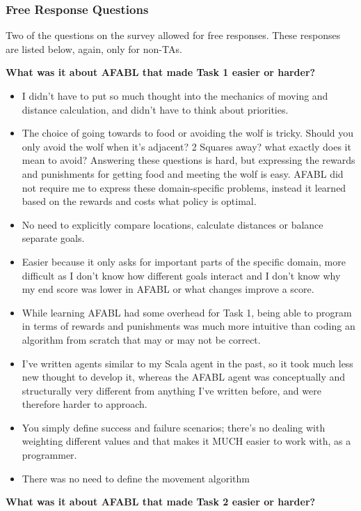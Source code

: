 \subsubsection{Free Response Questions}

Two of the questions on the survey allowed for free responses. These responses are listed below, again, only for non-TAs.

{\bf What was it about AFABL that made Task 1 easier or harder?}

\begin{itemize}
\item I didn't have to put so much thought into the mechanics of moving and distance calculation, and didn't have to think about priorities.
\item The choice of going towards to food or avoiding the wolf is tricky. Should you only avoid the wolf when it's adjacent? 2 Squares away? what exactly does it mean to avoid? Answering these questions is hard, but expressing the rewards and punishments for getting food and meeting the wolf is easy. AFABL did not require me to express these domain-specific problems, instead it learned based on the rewards and costs what policy is optimal.
\item No need to explicitly compare locations, calculate distances or balance separate goals.
\item Easier because it only asks for important parts of the specific domain, more difficult as I don't know how different goals interact and I don't know why my end score was lower in AFABL or what changes improve a score.
\item While learning AFABL had some overhead for Task 1, being able to program in terms of rewards and punishments was much more intuitive than coding an algorithm from scratch that may or may not be correct.
\item I've written agents similar to my Scala agent in the past, so it took much less new thought to develop it, whereas the AFABL agent was conceptually and structurally very different from anything I've written before, and were therefore harder to approach.
\item You simply define success and failure scenarios; there's no dealing with weighting different values and that makes it MUCH easier to work with, as a programmer.
\item There was no need to define the movement algorithm
\end{itemize}

{\bf What was it about AFABL that made Task 2 easier or harder?}

